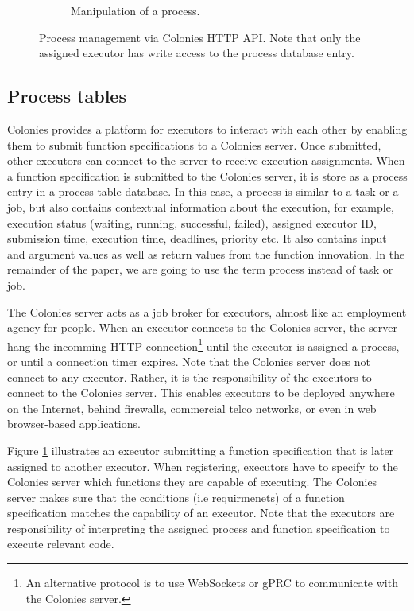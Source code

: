 \documentclass{article}
\begin{document}
\begin{figure}
\begin{subfigure}[b]{0.3\textwidth}
         \caption{Manipulation of a process.}
     \end{subfigure}
     \caption{Process management via Colonies HTTP API. Note that only the assigned executor has write access to the process database entry.}
     \label{fig:process_assignment}
\end{figure}

\subsection{Process tables}
Colonies provides a platform for executors to interact with each other by enabling them to submit function specifications to a Colonies server. Once submitted, other executors can connect to the server to receive execution assignments. When a function specification is submitted to the Colonies server, it is store as a process entry in a process table database. In this case, a process is similar to a task or a job, but also contains contextual information about the execution, for example, execution status (waiting, running, successful, failed), assigned executor ID, submission time, execution time, deadlines, priority etc. It also contains input and argument values as well as return values from the function innovation. In the remainder of the paper, we are going to use the term process instead of task or job.

The Colonies server acts as a job broker for executors, almost like an employment agency for people. When an executor connects to the Colonies server, the server hang the incomming HTTP connection\footnote{An alternative protocol is to use WebSockets or gPRC to communicate with the Colonies server.} until the executor is assigned a process, or until a connection timer expires. Note that the Colonies server does not connect to any executor. Rather, it is the responsibility of the executors to connect to the Colonies server. This enables executors to be deployed anywhere on the Internet, behind firewalls, commercial telco networks, or even in web browser-based applications.

Figure \ref{fig:process_assignment} illustrates an executor submitting a function specification that is later assigned to another executor. When registering, executors have to specify to the Colonies server which functions they are capable of executing. The Colonies server makes sure that the conditions (i.e requirmenets) of a function specification matches the capability of an executor. Note that the executors are responsibility of interpreting the assigned process and function specification to execute relevant code.
\end{document}
